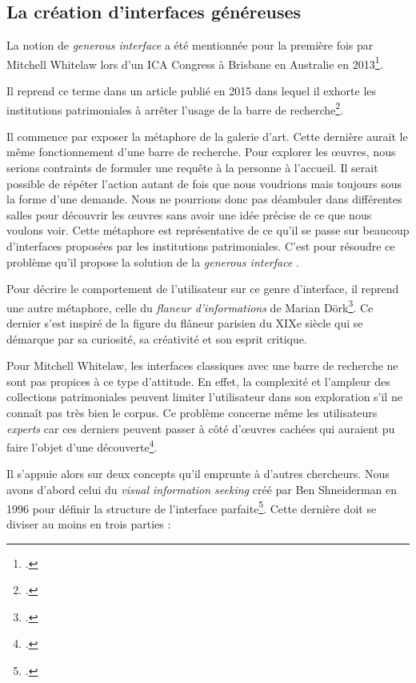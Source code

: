\subsection{La création d'interfaces généreuses}


La notion de \og \textit{generous interface} \fg a été mentionnée pour la première fois par Mitchell Whitelaw lors d'un ICA Congress à Brisbane en Australie en 2013\footcite{GenerousInterfacesArchival}.

Il reprend ce terme dans un article publié en 2015 dans lequel il exhorte les institutions patrimoniales à arrêter l'usage de la barre de recherche\footcite{whitelawGenerousInterfacesDigital2015}. 

Il commence par exposer la métaphore de la galerie d'art. Cette dernière aurait le même fonctionnement d'une barre de recherche. Pour explorer les œuvres, nous serions contraints de formuler une requête à la personne à l'accueil. Il serait possible de répéter l'action autant de fois que nous voudrions mais toujours sous la forme d'une demande. Nous ne pourrions donc pas déambuler dans différentes salles pour découvrir les œuvres sans avoir une idée précise de ce que nous voulons voir. Cette métaphore est représentative de ce qu'il se passe sur beaucoup d'interfaces proposées par les institutions patrimoniales. C'est pour résoudre ce problème qu'il propose la solution de la \og \textit{generous interface} \fg.

Pour décrire le comportement de l'utilisateur sur ce genre d'interface, il reprend une autre métaphore, celle du \og \textit{flaneur d'informations} \fg de Marian Dörk\footcite{dorkInformationFlaneurFresh2011}. Ce dernier s'est inspiré de la figure du flâneur parisien du XIXe siècle qui se démarque par sa curiosité, sa créativité et son esprit critique. 

Pour Mitchell Whitelaw, les interfaces classiques avec une barre de recherche ne sont pas propices à ce type d'attitude. En effet, la complexité et l'ampleur des collections patrimoniales peuvent limiter l'utilisateur dans son exploration s'il ne connaît pas très bien le corpus. Ce problème concerne même les utilisateurs \og \textit{experts} \fg car ces derniers peuvent passer à côté d'œuvres cachées qui auraient pu faire l'objet d'une découverte\footcite{whitelawGenerousInterfacesDigital2015}. 

Il s'appuie alors sur deux concepts qu'il emprunte à d'autres chercheurs. 
Nous avons d'abord celui du \og \textit{visual information seeking} créé par Ben Shneiderman en 1996 pour définir la structure de l'interface parfaite\footcite{shneidermanEyesHaveIt}. Cette dernière doit se diviser au moins en trois parties : 

